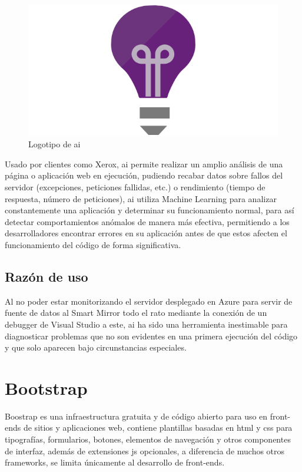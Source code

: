 \begin{figure}[!htbp]
	\centering
	\includegraphics[scale=0.50]{fig/applicationinsights_logo}
	\caption{Logotipo de \acrfull{ai}}
\end{figure}

\FloatBarrier

Usado por clientes como Xerox\cite{Xerox}, \acrshort{ai} permite realizar un amplio análisis de una página o aplicación web en ejecución, pudiendo recabar datos sobre fallos del servidor (excepciones, peticiones fallidas, etc.) o rendimiento (tiempo de respuesta, número de peticiones), \acrshort{ai} utiliza Machine Learning para analizar constantemente una aplicación y determinar su funcionamiento normal, para así detectar comportamientos anómalos de manera más efectiva, permitiendo a los desarrolladores encontrar errores en su aplicación antes de que estos afecten el funcionamiento del código de forma significativa.

\subsection{Razón de uso}

Al no poder estar monitorizando el servidor desplegado en Azure para servir de fuente de datos al Smart Mirror todo el rato mediante la conexión de un debugger de Visual Studio a este, \acrshort{ai} ha sido una herramienta inestimable para diagnosticar problemas que no son evidentes en una primera ejecución del código y que solo aparecen bajo circunstancias especiales.

\section{Bootstrap}

Boostrap\cite{Bootstrap} es una infraestructura gratuita y de código abierto para uso en front-ends de sitios y aplicaciones web, contiene plantillas basadas en \acrshort{html} y \acrshort{css} para tipografías, formularios, botones, elementos de navegación y otros componentes de interfaz, además de extensiones \acrfull{js} opcionales, a diferencia de muchos otros frameworks, se limita únicamente al desarrollo de front-ends.

